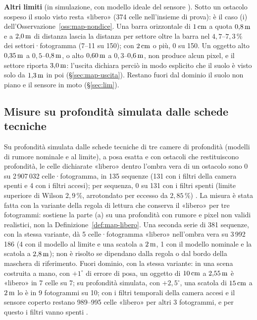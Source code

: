 \textbf{Altri limiti} (in simulazione, con modello ideale del sensore ). Sotto un ostacolo sospeso il suolo visto resta «libero» (374 celle nell'insieme di prova): è il caso (i) dell'Osservazione~\ref{oss:map-nondice}. Una barra orizzontale di $1\,\mathrm{cm}$ a quota $0{,}8\,\mathrm{m}$ e a $2{,}0\,\mathrm{m}$ di distanza lascia la distanza per settore oltre la barra nel $4{,}7$–$7{,}3\,\%$ dei settori·fotogramma (7–11 su 150); con $2\,\mathrm{cm}$ o più, 0 su 150. Un oggetto alto $0{,}35\,\mathrm{m}$ a $0{,}5$–$0{,}8\,\mathrm{m}$, o alto $0{,}60\,\mathrm{m}$ a $0{,}3$–$0{,}6\,\mathrm{m}$, non produce alcun pixel, e il settore riporta $3{,}0\,\mathrm{m}$: l'uscita dichiara perciò in modo esplicito che il suolo è visto solo da $1{,}3\,\mathrm{m}$ in poi (\S\ref{sec:map-uscita}). Restano fuori dal dominio il suolo non piano e il sensore in moto (\S\ref{sec:lim}).

\subsection{Misure su profondità simulata dalle schede tecniche}\label{sec:map-schede}

Su profondità simulata dalle schede tecniche di tre camere di profondità (modelli di rumore nominale e al limite), a posa esatta e con ostacoli che restituiscono profondità, le celle dichiarate «libero» dentro l'ombra vera di un ostacolo sono 0 su 2\,907\,032 celle·fotogramma, in 135 sequenze (131 con i filtri della camera spenti e 4 con i filtri accesi); per sequenza, 0 su 131 con i filtri spenti (limite superiore di Wilson $2{,}9\,\%$, arrotondato per eccesso da $2{,}85\,\%$) . La misura è stata fatta con la variante della regola di lettura che conserva il «libero» per tre fotogrammi: sostiene la parte (a) su una profondità con rumore e pixel non validi realistici, non la Definizione~\ref{def:map-libero}. Una seconda serie di 381 sequenze, con la stessa variante, dà 5 celle·fotogramma «libero» nell'ombra vera su 3\,992\,186 (4 con il modello al limite e una scatola a $2\,\mathrm{m}$, 1 con il modello nominale e la scatola a $2{,}8\,\mathrm{m}$); non è risolto se dipendano dalla regola o dal bordo della maschera di riferimento. Fuori dominio, con la stessa variante: in una scena costruita a mano, con $+1^\circ$ di errore di posa, un oggetto di $10\,\mathrm{cm}$ a $2{,}55\,\mathrm{m}$ è «libero» in 7 celle su 7; su profondità simulata, con $+2{,}5^\circ$, una scatola di $15\,\mathrm{cm}$ a $2\,\mathrm{m}$ lo è in 9 fotogrammi su 10; con i filtri temporali della camera accesi e il sensore coperto restano 989–995 celle «libero» per altri 3 fotogrammi, e per questo i filtri vanno spenti .

